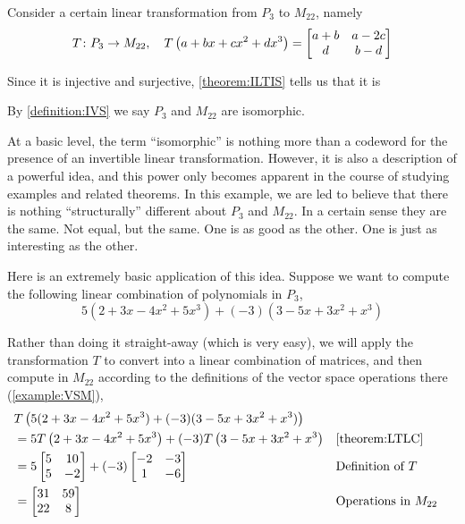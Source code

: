 \documentclass{ximera}
\begin{document}
\begin{example}
Consider a certain linear transformation from $P_3$ to $M_{22}$, namely
\[T\colon P_3\rightarrow M_{22},\quad T\left(a+bx+cx^2+dx^3\right)=
\begin{bmatrix}
a+b & a-2c\\
d & b-d
\end{bmatrix}
\]

Since it is injective and surjective, \ref{theorem:ILTIS} tells us that it is 
\begin{multipleChoice}
\end{multipleChoice}

\begin{feedback}[correct]
By \ref{definition:IVS} we say $P_3$ and $M_{22}$ are isomorphic.
\end{feedback}


At a basic level, the term ``isomorphic'' is nothing more than a codeword for the presence of an invertible linear transformation.  However, it is also a description of a powerful idea, and this power only becomes apparent in the course of studying examples and related theorems.  In this example, we are led to believe that there is nothing ``structurally'' different about $P_3$ and $M_{22}$.  In a certain sense they are the same.  Not equal, but the same.  One is as good as the other.  One is just as interesting as the other.



Here is an extremely basic application of this idea.  Suppose we want to compute the following linear combination of polynomials in $P_3$,
\[
5(2+3x-4x^2+5x^3)+(-3)(3-5x+3x^2+x^3)
\]




Rather than doing it straight-away (which is very easy), we will apply the transformation $T$ to convert into a linear combination of matrices, and then compute in $M_{22}$ according to the definitions of the vector space operations there (\ref{example:VSM}),
\begin{align*}
&T\left(5(2+3x-4x^2+5x^3)+(-3)(3-5x+3x^2+x^3)\right)\\
&=5T\left(2+3x-4x^2+5x^3\right)+(-3)T\left(3-5x+3x^2+x^3\right)&&\ref{theorem:LTLC}\\
&=5
\begin{bmatrix}
5 & 10\\5 & -2
\end{bmatrix}
+(-3)
\begin{bmatrix}
-2 & -3\\1 & -6
\end{bmatrix}&&\text{Definition of $T$}\\
&=
\begin{bmatrix}
31 & 59\\22 & 8
\end{bmatrix}&&\text{Operations in $M_{22}$}
\end{align*}





\end{example}
\end{document}
